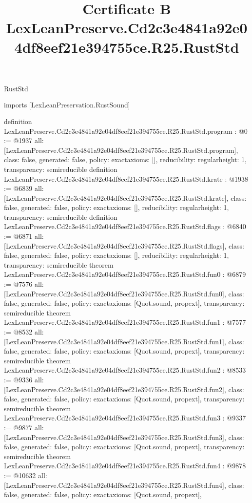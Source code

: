 \begin{lexlean}{RustStd}
\title{Certificate B LexLeanPreserve.Cd2c3e4841a92e04df8eef21e394755ce.R25.RustStd}
\begin{coremodule}
imports [LexLeanPreservation.RustSound]

definition LexLeanPreserve.Cd2c3e4841a92e04df8eef21e394755ce.R25.RustStd.program : @0 := @1937 {
  all: [LexLeanPreserve.Cd2c3e4841a92e04df8eef21e394755ce.R25.RustStd.program],
  class: false,
  generated: false,
  policy: exact{axioms: []},
  reducibility: regular{height: 1},
  transparency: semireducible
}
definition LexLeanPreserve.Cd2c3e4841a92e04df8eef21e394755ce.R25.RustStd.krate : @1938 := @6839 {
  all: [LexLeanPreserve.Cd2c3e4841a92e04df8eef21e394755ce.R25.RustStd.krate],
  class: false,
  generated: false,
  policy: exact{axioms: []},
  reducibility: regular{height: 1},
  transparency: semireducible
}
definition LexLeanPreserve.Cd2c3e4841a92e04df8eef21e394755ce.R25.RustStd.flags : @6840 := @6871 {
  all: [LexLeanPreserve.Cd2c3e4841a92e04df8eef21e394755ce.R25.RustStd.flags],
  class: false,
  generated: false,
  policy: exact{axioms: []},
  reducibility: regular{height: 1},
  transparency: semireducible
}
theorem LexLeanPreserve.Cd2c3e4841a92e04df8eef21e394755ce.R25.RustStd.fun0 : @6879 := @7576 {
  all: [LexLeanPreserve.Cd2c3e4841a92e04df8eef21e394755ce.R25.RustStd.fun0],
  class: false,
  generated: false,
  policy: exact{axioms: [Quot.sound, propext]},
  transparency: semireducible
}
theorem LexLeanPreserve.Cd2c3e4841a92e04df8eef21e394755ce.R25.RustStd.fun1 : @7577 := @8532 {
  all: [LexLeanPreserve.Cd2c3e4841a92e04df8eef21e394755ce.R25.RustStd.fun1],
  class: false,
  generated: false,
  policy: exact{axioms: [Quot.sound, propext]},
  transparency: semireducible
}
theorem LexLeanPreserve.Cd2c3e4841a92e04df8eef21e394755ce.R25.RustStd.fun2 : @8533 := @9336 {
  all: [LexLeanPreserve.Cd2c3e4841a92e04df8eef21e394755ce.R25.RustStd.fun2],
  class: false,
  generated: false,
  policy: exact{axioms: [Quot.sound, propext]},
  transparency: semireducible
}
theorem LexLeanPreserve.Cd2c3e4841a92e04df8eef21e394755ce.R25.RustStd.fun3 : @9337 := @9877 {
  all: [LexLeanPreserve.Cd2c3e4841a92e04df8eef21e394755ce.R25.RustStd.fun3],
  class: false,
  generated: false,
  policy: exact{axioms: [Quot.sound, propext]},
  transparency: semireducible
}
theorem LexLeanPreserve.Cd2c3e4841a92e04df8eef21e394755ce.R25.RustStd.fun4 : @9878 := @10632 {
  all: [LexLeanPreserve.Cd2c3e4841a92e04df8eef21e394755ce.R25.RustStd.fun4],
  class: false,
  generated: false,
  policy: exact{axioms: [Quot.sound, propext]},
}
\end{coremodule}
\end{lexlean}
